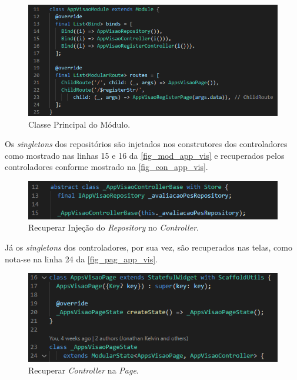 \begin{figure}[htb]
    \caption{\label{fig_mod_app_vis}Classe Principal do Módulo.}
    \begin{center}
        \includegraphics[scale=0.7]{Imagens/desenvolvimento/app_visao_module.png}
    \end{center}
\end{figure}

Os \emph{singletons} dos repositórios são injetados nos construtores dos controladores como mostrado nas linhas 15
e 16 da \autoref{fig_mod_app_vis} e recuperados pelos controladores conforme mostrado na \autoref{fig_con_app_vis}.

\begin{figure}[htb]
    \caption{\label{fig_con_app_vis}Recuperar Injeção do \emph{Repository} no \emph{Controller}.}
    \begin{center}
        \includegraphics[scale=0.9]{Imagens/desenvolvimento/app_visao_controller.png}
    \end{center}
\end{figure}

Já os \emph{singletons} dos controladores, por sua vez, são recuperados nas telas,
como nota-se na linha 24 da \autoref{fig_pag_app_vis}.

\begin{figure}[htb]
    \caption{\label{fig_pag_app_vis}Recuperar \emph{Controller} na \emph{Page}.}
    \begin{center}
        \includegraphics[scale=0.9]{Imagens/desenvolvimento/app_visao_page.png}
    \end{center}
\end{figure}

